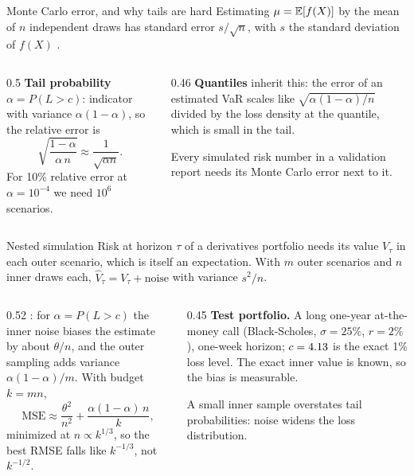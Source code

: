 \documentclass[aspectratio=169,10pt]{beamer}
\begin{document}
\begin{frame}{Monte Carlo error, and why tails are hard}
  \small
  Estimating $\mu = \mathbb{E}[f(X)]$ by the mean of $n$ independent draws has standard error $s/\sqrt n$, with $s$ the standard deviation of $f(X)$ \citep{glasserman2003monte}.
  \begin{columns}[T]
    \begin{column}{0.5\textwidth}
      \textbf{Tail probability} $\alpha = P(L > c)$: indicator with variance $\alpha(1 - \alpha)$, so the relative error is
      \[ \sqrt{\frac{1 - \alpha}{\alpha\,n}} \approx \frac{1}{\sqrt{\alpha n}} . \]
      For 10\% relative error at $\alpha = 10^{-4}$ we need $10^6$ scenarios.
    \end{column}
    \begin{column}{0.46\textwidth}
      \textbf{Quantiles} inherit this: the error of an estimated VaR scales like $\sqrt{\alpha(1-\alpha)/n}$ divided by the loss density at the quantile, which is small in the tail.
      \vspace{0.3em}

      Every simulated risk number in a validation report needs its Monte Carlo error next to it.
    \end{column}
  \end{columns}
\end{frame}

\begin{frame}{Nested simulation}
  \small
  Risk at horizon $\tau$ of a derivatives portfolio needs its value $V_\tau$ in each outer scenario, which is itself an expectation. With $m$ outer scenarios and $n$ inner draws each, $\hat V_\tau = V_\tau + \text{noise}$ with variance $s^2/n$.
  \begin{columns}[T]
    \begin{column}{0.52\textwidth}
      \citet{gordy2010nested}: for $\alpha = P(L > c)$ the inner noise biases the estimate by about $\theta/n$, and the outer sampling adds variance $\alpha(1-\alpha)/m$. With budget $k = mn$,
      \[ \mathrm{MSE} \approx \frac{\theta^2}{n^2} + \frac{\alpha(1-\alpha)\,n}{k}, \]
      minimized at $n \propto k^{1/3}$, so the best RMSE falls like $k^{-1/3}$, not $k^{-1/2}$.
    \end{column}
    \begin{column}{0.45\textwidth}
      \textbf{Test portfolio.} A long one-year at-the-money call (Black-Scholes, $\sigma = 25\%$, $r = 2\%$), one-week horizon; $c = 4.13$ is the exact 1\% loss level. The exact inner value is known, so the bias is measurable.
      \vspace{0.3em}

      A small inner sample overstates tail probabilities: noise widens the loss distribution.
    \end{column}
  \end{columns}
\end{frame}
\end{document}
